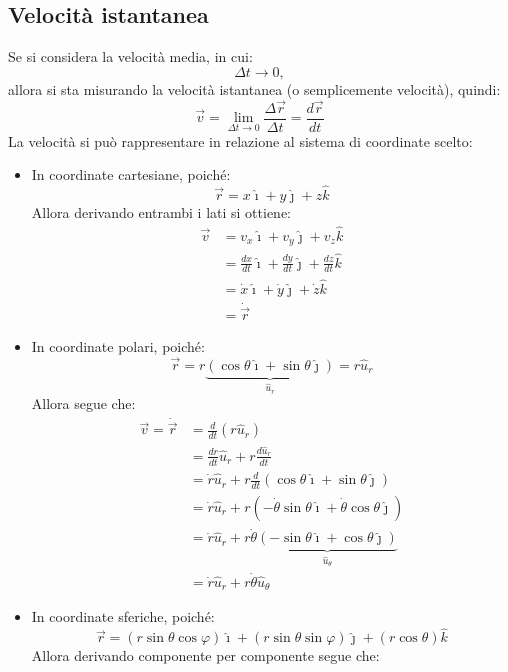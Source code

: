 \documentclass[11pt, a4paper, openright]{book}
\theoremstyle{plain}
\theoremstyle{definition}
\begin{document}
\subsection{Velocità istantanea}
Se si considera la velocità media, in cui:
\[\Delta t \rightarrow 0,\]
allora si sta misurando la velocità istantanea (o semplicemente velocità), quindi:
\[\vec{v} = \lim_{\Delta t \rightarrow 0} \frac{\Delta \vec{r}}{\Delta t} = \frac{d\vec{r}}{dt}\]
La velocità si può rappresentare in relazione al sistema di coordinate scelto:
\begin{itemize}
    \item In coordinate cartesiane, poiché:
    \[\vec{r} = x\hat{\imath} + y\hat{\jmath} + z\hat{k}\]
    Allora derivando entrambi i lati si ottiene:
    \begin{align}
        \vec{v} & = v_x\hat{\imath} + v_y\hat{\jmath} + v_z\hat{k} \\
                & = \frac{dx}{dt}\hat{\imath} + \frac{dy}{dt}\hat{\jmath} + \frac{dz}{dt}\hat{k} \\
                & = \dot{x}\hat{\imath} + \dot{y}\hat{\jmath} + \dot{z}\hat{k} \\
                & = \dot{\vec{r}}
    \end{align}
    \item In coordinate polari, poiché:
    \[\vec{r} = r\underbrace{(\cos\theta \hat{\imath} + \sin\theta \hat{\jmath})}_{\hat{u}_r} = r\hat{u}_r\]
    Allora segue che:
    \begin{align}
        \vec{v} = \dot{\vec{r}} & = \frac{d}{dt}(r\hat{u}_r) \\
        & = \frac{dr}{dt}\hat{u}_r + r\frac{d\hat{u}_r}{dt} \\
        & = \dot{r}\hat{u}_r + r\frac{d}{dt}(\cos\theta \hat{\imath} + \sin\theta \hat{\jmath}) \\
        & = \dot{r}\hat{u}_r + r(-\dot{\theta}\sin\theta\hat{\imath} + \dot{\theta}\cos\theta\hat{\jmath}) \\
        & = \dot{r}\hat{u}_r + r\dot{\theta}\underbrace{(-\sin\theta\hat{\imath} + \cos\theta\hat{\jmath})}_{\hat{u}_\theta} \\
        & = \dot{r}\hat{u}_r + r\dot{\theta}\hat{u}_\theta
    \end{align}
    \item In coordinate sferiche, poiché:
    \[\vec{r} = (r\sin\theta\cos\varphi)\hat{\imath} + (r\sin\theta\sin\varphi)\hat{\jmath} + (r\cos\theta)\hat{k}\]
    Allora derivando componente per componente segue che:
    \begin{itemize}

\end{itemize}
\end{itemize}
\end{document}
